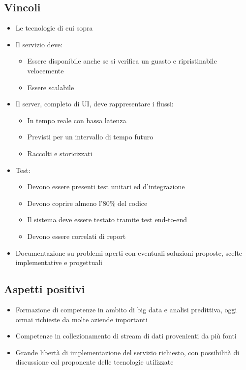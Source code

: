 \subsection{Vincoli}
\begin{itemize}
    \item Le tecnologie di cui sopra
    \item Il servizio deve:
    \begin{itemize}
        \item Essere disponibile anche se si verifica un guasto e ripristinabile velocemente
        \item Essere scalabile
    \end{itemize}
    \item Il server, completo di UI, deve rappresentare i flussi:
    \begin{itemize}
        \item In tempo reale con bassa latenza
        \item Previsti per un intervallo di tempo futuro
        \item Raccolti e storicizzati
    \end{itemize}
    \item Test:
    \begin{itemize}
        \item Devono essere presenti test unitari ed d'integrazione
        \item Devono coprire almeno l'80\% del codice
        \item Il sistema deve essere testato tramite test end-to-end
        \item Devono essere correlati di report
    \end{itemize}
    \item Documentazione su problemi aperti con eventuali soluzioni proposte, scelte implementative e progettuali
\end{itemize}
\subsection{Aspetti positivi}
\begin{itemize}
    \item Formazione di competenze in ambito di big data e analisi predittiva, oggi ormai richieste da molte aziende importanti
    \item Competenze in collezionamento di stream di dati provenienti da più fonti
    \item Grande libertà di implementazione del servizio richiesto, con possibilità di discussione col proponente delle tecnologie utilizzate
\end{itemize}
